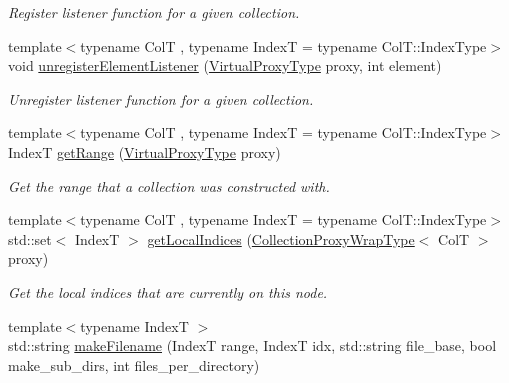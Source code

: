 \begin{DoxyCompactItemize}
\begin{DoxyCompactList}\small\item\em Register listener function for a given collection. \end{DoxyCompactList}\item 
{\footnotesize template$<$typename ColT , typename IndexT  = typename Col\+T\+::\+Index\+Type$>$ }\\void \hyperlink{structvt_1_1vrt_1_1collection_1_1_collection_manager_aecfd5c34b6d0b6781d3bb089ba1ae547}{unregister\+Element\+Listener} (\hyperlink{namespacevt_a1b417dd5d684f045bb58a0ede70045ac}{Virtual\+Proxy\+Type} proxy, int element)
\begin{DoxyCompactList}\small\item\em Unregister listener function for a given collection. \end{DoxyCompactList}\item 
{\footnotesize template$<$typename ColT , typename IndexT  = typename Col\+T\+::\+Index\+Type$>$ }\\IndexT \hyperlink{structvt_1_1vrt_1_1collection_1_1_collection_manager_a9259954aca1df3a68ad1d0a730687612}{get\+Range} (\hyperlink{namespacevt_a1b417dd5d684f045bb58a0ede70045ac}{Virtual\+Proxy\+Type} proxy)
\begin{DoxyCompactList}\small\item\em Get the range that a collection was constructed with. \end{DoxyCompactList}\item 
{\footnotesize template$<$typename ColT , typename IndexT  = typename Col\+T\+::\+Index\+Type$>$ }\\std\+::set$<$ IndexT $>$ \hyperlink{structvt_1_1vrt_1_1collection_1_1_collection_manager_a0708d6144e7beea89e4f07fae88e16fc}{get\+Local\+Indices} (\hyperlink{structvt_1_1vrt_1_1collection_1_1_collection_manager_a56458ed7f9bb22b631b9b3a745f42f94}{Collection\+Proxy\+Wrap\+Type}$<$ ColT $>$ proxy)
\begin{DoxyCompactList}\small\item\em Get the local indices that are currently on this node. \end{DoxyCompactList}\item 
{\footnotesize template$<$typename IndexT $>$ }\\std\+::string \hyperlink{structvt_1_1vrt_1_1collection_1_1_collection_manager_ae8d3db4274a1239fa0097dae11e93bb9}{make\+Filename} (IndexT range, IndexT idx, std\+::string file\+\_\+base, bool make\+\_\+sub\+\_\+dirs, int files\+\_\+per\+\_\+directory)

\end{DoxyCompactItemize}
